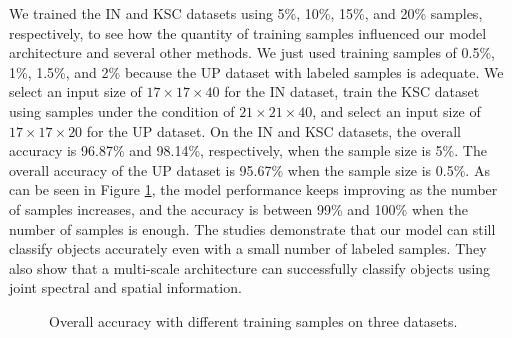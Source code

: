 \documentclass[]{interact}
\theoremstyle{plain}%
\theoremstyle{definition}
\theoremstyle{remark}
\begin{document}
We trained the IN and KSC datasets using 5\%, 10\%, 15\%, and 20\% samples, respectively, to see how the quantity of training samples influenced our model architecture and several other methods. We just used training samples of 0.5\%, 1\%, 1.5\%, and 2\% because the UP dataset with labeled samples is adequate. We select an input size of $17 \times 17 \times 40$ for the IN dataset, train the KSC dataset using samples under the condition of $21 \times 21 \times 40$, and select an input size of $17 \times 17 \times 20$ for the UP dataset. On the IN and KSC datasets, the overall accuracy is 96.87\% and 98.14\%, respectively, when the sample size is 5\%. The overall accuracy of the UP dataset is 95.67\% when the sample size is 0.5\%. As can be seen in Figure \ref{fig:9}, the model performance keeps improving as the number of samples increases, and the accuracy is between 99\% and 100\% when the number of samples is enough. The studies demonstrate that our model can still classify objects accurately even with a small number of labeled samples. They also show that a multi-scale architecture can successfully classify objects using joint spectral and spatial information.
\begin{figure}[!h]
\centering\small
{}
\caption{Overall accuracy with different training samples on three datasets.}\label{fig:9}
\end{figure}
\end{document}

